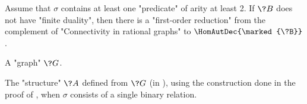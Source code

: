 \begin{lemma}
	\AP\label{lem:reduction-hom}
	Assume that $\sigma$ contains at least one "predicate" of arity at least 2.
	If $\?B$ does not have "finite duality", then there is a "first-order reduction" 
	from the complement of "Connectivity in rational graphs" to $\HomAutDec{\marked{\?B}}$.
\end{lemma}

\begin{marginfigure}
	\centering
	\begin{tikzpicture}
		
	\end{tikzpicture}
	\caption{
		\AP\label{fig:graph-to-struct-graph}
		A "graph" $\?G$.
	}
\end{marginfigure}
\begin{marginfigure}
	\centering
	\begin{tikzpicture}
		
	\end{tikzpicture}
	\caption{
		\AP\label{fig:graph-to-struct-struct}
		The "structure" $\?A$ defined from $\?G$ (in ),
		using the construction done in the proof of ,
		when $\sigma$ consists of a single binary relation.
	}
\end{marginfigure}

